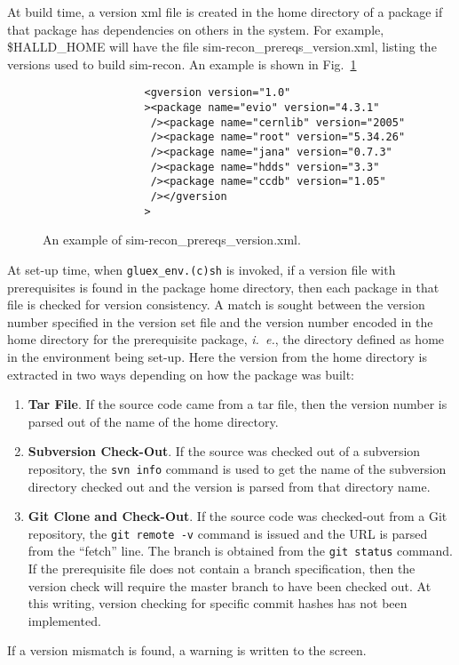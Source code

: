 \documentclass[12pt, letterpaper]{article}
\begin{document}
At build time, a version xml file is created in the home directory of
a package if that package has dependencies on others in the
system. For example, \$HALLD\_HOME will have the file
sim-recon\_prereqs\_version.xml, listing the versions used to build
sim-recon. An example is shown in Fig.~\ref{figure:prereqs-xml-file}

\begin{figure}
\begin{verbatim}
                <gversion version="1.0"
                ><package name="evio" version="4.3.1"
                 /><package name="cernlib" version="2005"
                 /><package name="root" version="5.34.26"
                 /><package name="jana" version="0.7.3"
                 /><package name="hdds" version="3.3"
                 /><package name="ccdb" version="1.05"
                 /></gversion
                >
\end{verbatim}
\caption{An example of sim-recon\_prereqs\_version.xml.}\label{figure:prereqs-xml-file}
\end{figure}

At set-up time, when {\tt gluex\_env.(c)sh} is invoked, if a version
file with prerequisites is found in the package home directory, then
each package in that file is checked for version consistency. A match
is sought between the version number specified in the version set file and
the version number encoded in the home directory for the prerequisite
package, {\it i.~e.}, the directory defined as home in the environment
being set-up. Here the version from the home directory is extracted in
two ways depending on how the package was built:
\begin{enumerate}

\item {\bf Tar File}. If the source code came from a tar file, then
  the version number is parsed out of the name of the home directory.

\item {\bf Subversion Check-Out}. If the source was checked out of a
  subversion repository, the {\tt svn info} command is used to get the
  name of the subversion directory checked out and the version is
  parsed from that directory name.

\item {\bf Git Clone and Check-Out}. If the source code was
  checked-out from a Git repository, the {\tt git remote -v} command
  is issued and the URL is parsed from the ``fetch'' line. The branch
  is obtained from the {\tt git status} command. If the prerequisite
  file does not contain a branch specification, then the version check
  will require the master branch to have been checked out. At this
  writing, version checking for specific commit hashes has not been
  implemented.

\end{enumerate}
If a version mismatch is found, a warning is written to the screen.
\end{document}
